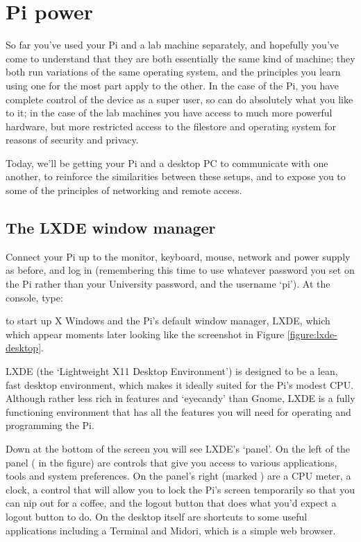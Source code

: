 \chapter{Pi power}

So far you've used your Pi and a lab machine separately, and hopefully you've come to understand that they are both essentially the same kind of machine; they both run variations of the same operating system, and the principles you learn using one for the most part apply to the other. In the case of the Pi, you have complete control of the device as a super user, so can do absolutely what you like to it; in the case of the lab machines you have access to much more powerful hardware, but more restricted access to the filestore and operating system for reasons of security and privacy. 

Today, we'll be getting your Pi and a desktop PC to communicate with one another, to reinforce the similarities between these setups, and to expose you to some of the principles of networking and remote access. 

\section{The LXDE window manager}

Connect your Pi up to the monitor, keyboard, mouse, network and power supply as before, and log in (remembering this time to use whatever password you set on the Pi rather than your University password, and the username `pi'). At the console, type:


to start up X Windows and the Pi's default window manager, LXDE, which which appear moments later looking like the screenshot in Figure \ref{figure:lxde-desktop}. 

LXDE (the `Lightweight X11 Desktop Environment') is designed to be a lean, fast desktop environment, which makes it ideally suited for the Pi's modest CPU. Although rather less rich in features and `eyecandy' than Gnome, LXDE is a fully functioning environment that has all the features you will need for operating and programming the Pi. 

Down at the bottom of the screen you will see LXDE's `panel'. On the left of the panel (\protect{} in the figure) are controls that give you access to various applications, tools and system preferences. On the panel's right (marked \protect{}) are a CPU meter, a clock, a control that will allow you to lock the Pi's screen temporarily so that you can nip out for a coffee, and the logout button that does what you'd expect a logout button to do. On the desktop itself are shortcuts to some useful applications including a Terminal and Midori, which is a simple web browser. 


